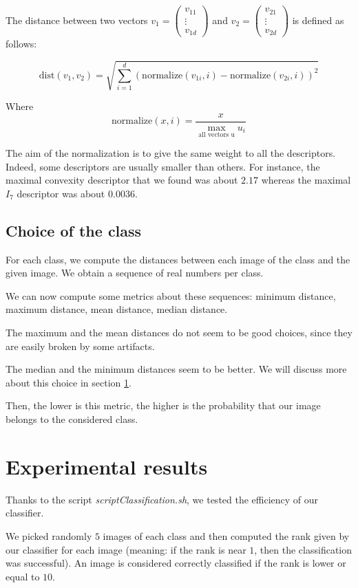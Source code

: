 \documentclass[a4paper,12pt]{article}
\theoremstyle{example}
\theoremstyle{remark}
\theoremstyle{definition}
\begin{document}
The distance between two vectors $v_1 = \begin{pmatrix}v_{11}\\\vdots\\ v_{1d}\end{pmatrix}$ and $v_2 = \begin{pmatrix}v_{21}\\\vdots\\ v_{2d}\end{pmatrix}$ is defined as follows:

\[\mathrm{dist}(v_1, v_2) = \sqrt{\sum_{i=1}^d \left(\mathrm{normalize}(v_{1i}, i)-\mathrm{normalize}(v_{2i}, i)\right)^2}\]

Where 
\[\mathrm{normalize}(x, i) = \frac{x}{\max_{\text{all vectors u}}u_i}\]

The aim of the normalization is to give the same weight to all the descriptors. Indeed, some descriptors are usually smaller than others. For instance, the maximal convexity descriptor that we found was about $2.17$ whereas the maximal $I_7$ descriptor was about $0.0036$.

\subsection{Choice of the class}

For each class, we compute the distances between each image of the class and the given image. We obtain a sequence of real numbers per class.

We can now compute some metrics about these sequences: minimum distance, maximum distance, mean distance, median distance.

The maximum and the mean distances do not seem to be good choices, since they are easily broken by some artifacts.

The median and the minimum distances seem to be better. We will discuss more about this choice in section \ref{exp}.

Then, the lower is this metric, the higher is the probability that our image belongs to the considered class.


\section{Experimental results}
\label{exp}

Thanks to the script \emph{scriptClassification.sh}, we tested the efficiency of our classifier.

We picked randomly $5$ images of each class and then computed the rank given by our classifier for each image (meaning: if the rank is near $1$, then the classification was successful). An image is considered correctly classified if the rank is lower or equal to $10$.
\end{document}
